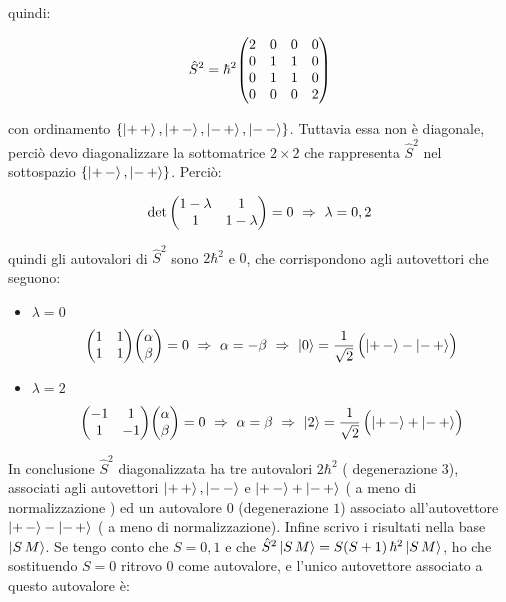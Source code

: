 	quindi:
	
\begin{align*}
	\hat{S}^2 = \hbar^2 \mqty( 2 & 0 & 0 & 0 \\ 0 & 1 & 1 & 0 \\ 0 & 1 & 1 & 0 \\ 0 & 0 & 0 & 2)
\end{align*}

	con ordinamento $\qty{\ket{+ \, +},  \ket{+ \, -}, \ket{- \, +}, \ket{-\, -}}$. Tuttavia essa non è diagonale, perciò devo diagonalizzare la sottomatrice $2 \times 2$ che rappresenta $\hat{S}^2$ nel sottospazio $\qty{\ket{+ \, -}, \ket{- \, +} }$. Perciò:
	
\begin{align*}
	\det \mqty( 1- \lambda & 1 \\ 1 & 1- \lambda   ) = 0 \, \, \Rightarrow \, \, \lambda = 0, 2
\end{align*}

	quindi gli autovalori di $\hat{S}^2$ sono $2\hbar^2$ e $0$, che corrispondono agli autovettori che seguono:
	
\begin{itemize}
	\item $\lambda = 0$ 
	\begin{align*}
		\mqty(1 & 1 \\ 1 & 1) \mqty(\alpha \\ \beta) = 0 \, \, \Rightarrow \, \, \alpha = - \beta \, \, \Rightarrow \, \,  \ket{0} = \frac{1}{\sqrt{2}} \, \qty\Big( \ket{+ \, -} - \ket{- \, +}  ) 
	\end{align*}
	
	\item $\lambda = 2$
	\begin{align*}
		\mqty(-1 & 1 \\ 1 & -1) \mqty(\alpha \\ \beta) = 0 \, \, \Rightarrow \, \, \alpha = \beta \, \, \Rightarrow \, \,  \ket{2} = \frac{1}{\sqrt{2}} \, \qty\Big( \ket{+ \, -} + \ket{- \, +}  ) 
	\end{align*}
	
\end{itemize}

	In conclusione $\hat{S}^2$ diagonalizzata ha tre autovalori $2\hbar^2$ ( degenerazione $3$), associati agli autovettori $\ket{+ \, +}, \ket{- \, -}$ e $\ket{+ \, -} + \ket{- \, +}$ ( a meno di normalizzazione ) ed un autovalore $0$ (degenerazione $1$) associato all'autovettore $\ket{+ \, -} - \ket{- \, +}$ ( a meno di normalizzazione). Infine scrivo i risultati nella base $\ket{S \, M}$. Se tengo conto che $S = 0, 1$ e che $\hat{S}^2 \ket{S \, M} = S \qty(S +1) \, \hbar^2 \ket{S \, M}$, ho che sostituendo $S = 0$ ritrovo $0$ come autovalore, e l'unico autovettore associato a questo autovalore è:
	

